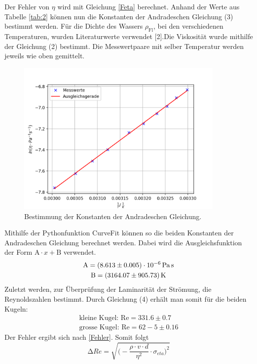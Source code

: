Der Fehler von $\eta$ wird mit Gleichung \ref{Feta} berechnet.
Anhand der Werte aus Tabelle \ref{tab:2} können nun die Konstanten der Andradeschen Gleichung (3) bestimmt werden.
Für die Dichte des Wassers $\rho_\text{Fl}$, bei den verschiedenen Temperaturen, wurden Literaturwerte verwendet [2].Die Viskosität wurde mithilfe der Gleichung (2) bestimmt.
Die Messwertpaare mit selber Temperatur werden jeweils wie oben gemittelt.
\begin{figure}[H]
    \centering
    \includegraphics[width=0.9\textwidth]{Auswertung/Graph1.pdf}
    \caption{Bestimmung der Konstanten der Andradeschen Gleichung.}
	\label{fig:graph}
\end{figure} 
Mithilfe der Pythonfunktion CurveFit können so die beiden Konstanten der Andradeschen Gleichung berechnet werden. Dabei wird die Ausgleichsfunktion der Form $\text{A}\cdot x + \text{B}$ verwendet.
\begin{gather*}
	\text{A} = \SI{8,613\pm0,005e-6}{\pascal\second}\\
	\text{B} = \SI{3164,07\pm905,73}{\kelvin}
\end{gather*}
Zuletzt werden, zur Überprüfung der Laminarität der Strömung, die Reynoldszahlen bestimmt. Durch Gleichung (4) erhält man somit für die beiden Kugeln:
\begin{gather*}
	\text{kleine Kugel: Re} = 331.6 \pm 0.7\\
	\text{grosse Kugel: Re} = 62-5 \pm 0.16
\end{gather*}
Der Fehler ergibt sich nach \ref{Fehler}. Somit folgt 
\begin{equation*}
	\increment Re = \sqrt{\biggl(-\frac{\rho\cdot v\cdot d}{\eta^2} \cdot \sigma_{eta}\biggr)^2}
\end{equation*}